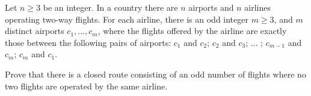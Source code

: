 Let $n\ge 3$ be an integer. In a country there are $n$ airports and $n$ airlines operating two-way flights. For each airline, there is an odd integer $m\ge 3$,  and $m$ distinct airports $c_1, \dots, c_m$,  where the flights offered by the airline are exactly those between the following pairs of airports: $c_1$ and $c_2$; $c_2$ and $c_3$; $\dots$ ; $c_{m-1}$ and $c_m$; $c_m$ and $c_1$.

Prove that there is a closed route consisting of an odd number of flights where no two flights are operated by the same airline.